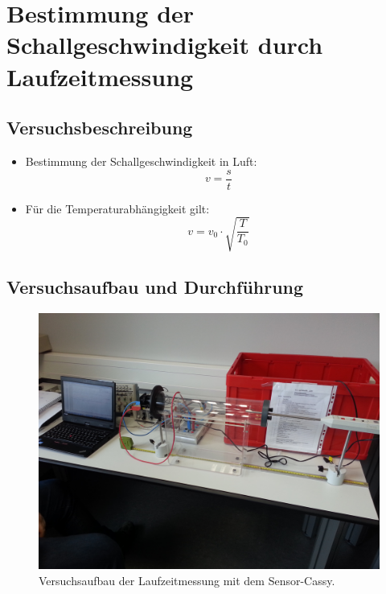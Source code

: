 \documentclass[11pt]{beamer}
\begin{document}

\section{Bestimmung der Schallgeschwindigkeit durch Laufzeitmessung}
\subsection{Versuchsbeschreibung}
\begin{frame}
\begin{itemize}
\item Bestimmung der Schallgeschwindigkeit in Luft:
\begin{equation*}
v=\frac{s}{t}
\end{equation*}
\item Für die Temperaturabhängigkeit gilt:
\begin{equation*}
v=v_0\cdot \sqrt{\frac{T}{T_0}} 
\end{equation*}
\end{itemize} 
\end{frame}
\subsection{Versuchsaufbau und Durchführung}
\begin{frame}
\begin{figure}[H]
\centering
\includegraphics[scale=0.08]{Bilder/laufzeit-cassy.jpg}
\caption{Versuchsaufbau der Laufzeitmessung mit dem Sensor-Cassy.}
\end{figure}
\end{frame}
\end{document}
